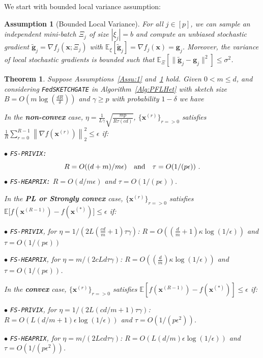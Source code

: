 \documentclass[11pt]{article}
\newtheorem{theorem}{Theorem}
\newtheorem{assumption}{Assumption}
\begin{document}
We start with bounded local variance assumption:
\begin{assumption}[Bounded Local Variance]\label{Assu:2}
For all $j\in [p]$, we can sample an independent mini-batch $\Xi_j$ of size $|{\xi}_j| = b$ and compute an unbiased stochastic gradient $\tilde{\mathbf{g}}_j = \nabla f_j(\boldsymbol{x}; \Xi_j)$ with $\mathbb{E}_{\xi}[\tilde{\mathbf{g}}_j] = \nabla f_{j}(\boldsymbol{x})={\mathbf{g}}_j$. 
Moreover, the variance of local stochastic gradients is bounded such that $
\mathbb{E}_{\Xi}\left[\|\tilde{\mathbf{g}}_j-{\mathbf{g}}_j\|^2\right]\leq \sigma^2$.
\end{assumption}
\begin{theorem}\label{thm:hetreg_case}
Suppose Assumptions~\ref{Assu:1} and~\ref{Assu:2} hold. Given $0<m\leq d$, and considering \texttt{FedSKETCHGATE} in Algorithm~\ref{Alg:PFLHet} with sketch size $B=O\left(m\log\left(\frac{d R}{\delta}\right)\right)$ and $\gamma\geq p$ with probability $1-\delta$ we have  



In the \textbf{non-convex} case, $\eta=\frac{1}{L\gamma}\sqrt{\frac{mp}{R\tau\left(cd\right)}}$, $\{ {\boldsymbol{x}}^{(r)}\}_{r=>0}$ satisfies  $\frac{1}{R}\sum_{r=0}^{R-1}\left\|\nabla f({\boldsymbol{x}}^{(r)})\right\|_2^2\leq {\epsilon}$ if: 
 
\noindent $\bullet$ \texttt{FS-PRIVIX:}    
\begin{equation}\notag
R=O((d+m)/m\epsilon) \quad \textrm{and} \quad \tau=O(1/(p\epsilon))\ .
 \end{equation}
\noindent $\bullet$ \texttt{FS-HEAPRIX:} $R=O(d/m\epsilon)$ and $\tau=O(1/(p\epsilon))$.

In the \textbf{PL or Strongly convex} case, $\{ {\boldsymbol{x}}^{(r)}\}_{r=>0}$ satisfies $\mathbb{E}\Big[f({\boldsymbol{x}}^{(R-1)})-f({\boldsymbol{x}}^{(*)})\Big]\leq \epsilon$ if: 

\noindent $\bullet$ \texttt{FS-PRIVIX}, for $\eta=1/(2L(\frac{cd}{m}+1)\tau\gamma)$: $R=O\left((\frac{d}{m}+1)\kappa \log(1/\epsilon)\right)$ and $\tau=O\left(1/(p\epsilon)\right)$

\noindent $\bullet$ \texttt{FS-HEAPRIX}, for $\eta=m/(2cLd\tau\gamma)$: $R=O\left((\frac{d}{m})\kappa \log(1/\epsilon)\right)$ and $\tau=O\left(1/(p\epsilon)\right)$.

 In the \textbf{convex} case, $\{ {\boldsymbol{x}}^{(r)}\}_{r=>0}$ satisfies $ \mathbb{E}[f({\boldsymbol{x}}^{(R-1)})-f({\boldsymbol{x}}^{(*)})]\leq \epsilon$ if: 
 
\noindent $\bullet$ \texttt{FS-PRIVIX}, for $\eta=1/(2L(c d/m+1)\tau\gamma)$:  $R=O\left(L(d/m+1)\epsilon \log(1/\epsilon)\right)$ and $\tau=O\left(1/(p\epsilon^2)\right)$.

\noindent $\bullet$ \texttt{FS-HEAPRIX}, for $\eta=m/(2L c d\tau\gamma)$: $R=O\left(L(d/m)\epsilon \log(1/\epsilon)\right)$ and $\tau=O\left(1/(p\epsilon^2)\right)$.
 \end{theorem}
\end{document}
